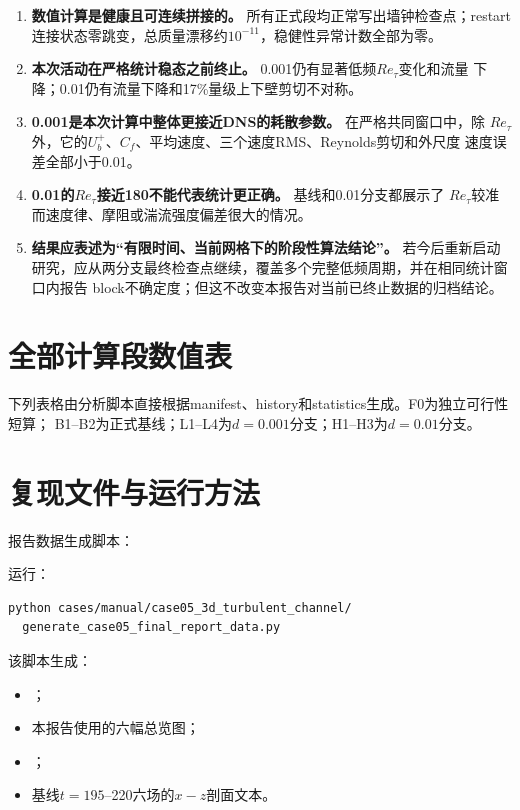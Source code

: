 \documentclass[UTF8,12pt,a4paper,fontset=fandol]{ctexart}
\newcommand{\Retau}{Re_{\tau}}
\begin{document}
\begin{enumerate}
  \item \textbf{数值计算是健康且可连续拼接的。} 所有正式段均正常写出墙钟检查点；restart
        连接状态零跳变，总质量漂移约$10^{-11}$，稳健性异常计数全部为零。
  \item \textbf{本次活动在严格统计稳态之前终止。} 0.001仍有显著低频$\Retau$变化和流量
        下降；0.01仍有流量下降和17\%量级上下壁剪切不对称。
  \item \textbf{0.001是本次计算中整体更接近DNS的耗散参数。} 在严格共同窗口中，除
        $\Retau$外，它的$U_b^+$、$C_f$、平均速度、三个速度RMS、Reynolds剪切和外尺度
        速度误差全部小于0.01。
  \item \textbf{0.01的$\Retau$接近180不能代表统计更正确。} 基线和0.01分支都展示了
        $\Retau$较准而速度律、摩阻或湍流强度偏差很大的情况。
  \item \textbf{结果应表述为“有限时间、当前网格下的阶段性算法结论”。} 若今后重新启动
        研究，应从两分支最终检查点继续，覆盖多个完整低频周期，并在相同统计窗口内报告
        block不确定度；但这不改变本报告对当前已终止数据的归档结论。
\end{enumerate}

\clearpage
\appendix

\section{全部计算段数值表}

下列表格由分析脚本直接根据manifest、history和statistics生成。F0为独立可行性短算；
B1--B2为正式基线；L1--L4为$d=0.001$分支；H1--H3为$d=0.01$分支。



\section{复现文件与运行方法}

报告数据生成脚本：
\begin{quote}\small
{}
\end{quote}
运行：
\begin{verbatim}
python cases/manual/case05_3d_turbulent_channel/
  generate_case05_final_report_data.py
\end{verbatim}
该脚本生成：
\begin{itemize}
  \item {}；
  \item 本报告使用的六幅总览图；
  \item {}；
  \item 基线$t=195$--220六场的$x-z$剖面文本。
\end{itemize}
\end{document}
